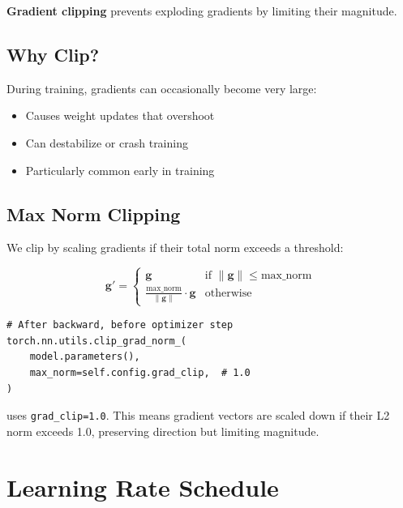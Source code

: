 \textbf{Gradient clipping} prevents exploding gradients by limiting their magnitude.

\subsection{Why Clip?}

During training, gradients can occasionally become very large:
\begin{itemize}
    \item Causes weight updates that overshoot
    \item Can destabilize or crash training
    \item Particularly common early in training
\end{itemize}

\subsection{Max Norm Clipping}

We clip by scaling gradients if their total norm exceeds a threshold:

\begin{equation}
\mathbf{g}' = \begin{cases}
\mathbf{g} & \text{if } \|\mathbf{g}\| \leq \text{max\_norm} \\
\frac{\text{max\_norm}}{\|\mathbf{g}\|} \cdot \mathbf{g} & \text{otherwise}
\end{cases}
\end{equation}

\begin{lstlisting}[style=python, caption={Gradient clipping from trainer.py}]
# After backward, before optimizer step
torch.nn.utils.clip_grad_norm_(
    model.parameters(),
    max_norm=self.config.grad_clip,  # 1.0
)
\end{lstlisting}

\begin{keypoint}
\TryLM uses \texttt{grad\_clip=1.0}. This means gradient vectors are scaled down if their L2 norm exceeds 1.0, preserving direction but limiting magnitude.
\end{keypoint}

\section{Learning Rate Schedule}

